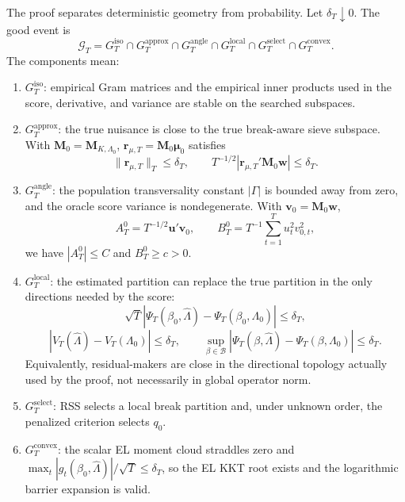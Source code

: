 \documentclass[12pt]{article}
\numberwithin{equation}{section}
\theoremstyle{definition}
\begin{document}
The proof separates deterministic geometry from probability. Let
\(\delta_T\downarrow0\). The good event is
\[
    \mathcal G_T
    =
    G_T^{\mathrm{iso}}
    \cap G_T^{\mathrm{approx}}
    \cap G_T^{\mathrm{angle}}
    \cap G_T^{\mathrm{local}}
    \cap G_T^{\mathrm{select}}
    \cap G_T^{\mathrm{convex}}.
\]
The components mean:
\begin{enumerate}[leftmargin=2em]
\item \(G_T^{\mathrm{iso}}\): empirical Gram matrices and the empirical inner
products used in the score, derivative, and variance are stable on the searched
subspaces.
\item \(G_T^{\mathrm{approx}}\): the true nuisance is close to the true
break-aware sieve subspace. With \(\bm M_0=\bm M_{K,\Lambda_0}\),
\(\bm r_{\mu,T}=\bm M_0\bm\mu_0\) satisfies
\[
    \|\bm r_{\mu,T}\|_T\le\delta_T,\qquad
    T^{-1/2}|\bm r_{\mu,T}'\bm M_0\bm w|\le\delta_T.
\]
\item \(G_T^{\mathrm{angle}}\): the population transversality constant
\(|\Gamma|\) is bounded away from zero, and the oracle score variance is
nondegenerate. With \(\bm v_0=\bm M_0\bm w\),
\[
    A_T^0=T^{-1/2}\bm u'\bm v_0,\qquad
    B_T^0=T^{-1}\sum_{t=1}^Tu_t^2v_{0,t}^2,
\]
we have \(|A_T^0|\le C\) and \(B_T^0\ge c>0\).
\item \(G_T^{\mathrm{local}}\): the estimated partition can replace the true
partition in the only directions needed by the score:
\[
    \sqrt T|\Psi_T(\beta_0,\widehat\Lambda)-\Psi_T(\beta_0,\Lambda_0)|
    \le\delta_T,
\]
\[
    |V_T(\widehat\Lambda)-V_T(\Lambda_0)|\le\delta_T,
    \qquad
    \sup_{\beta\in\mathcal B}
    |\Psi_T(\beta,\widehat\Lambda)-\Psi_T(\beta,\Lambda_0)|\le\delta_T.
\]
Equivalently, residual-makers are close in the directional topology actually
used by the proof, not necessarily in global operator norm.
\item \(G_T^{\mathrm{select}}\): RSS selects a local break partition and, under
unknown order, the penalized criterion selects \(q_0\).
\item \(G_T^{\mathrm{convex}}\): the scalar EL moment cloud straddles zero and
\(\max_t|g_t(\beta_0,\widehat\Lambda)|/\sqrt T\le\delta_T\), so the EL KKT root
exists and the logarithmic barrier expansion is valid.
\end{enumerate}
\end{document}
